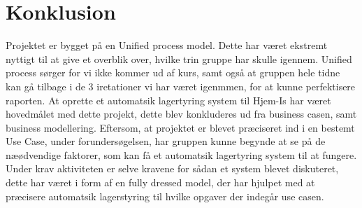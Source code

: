 \chapter{Konklusion}\label{ch:konklusion}

Projektet er bygget på en Unified process model. Dette har været ekstremt nyttigt til at give et overblik over, hvilke trin gruppe har skulle igennem. Unified process sørger for vi ikke kommer ud af kurs, samt også at gruppen hele tidne kan gå tilbage i de 3 iretationer vi har været igenmmen, for at kunne perfektisere raporten. 
At oprette et automatsik lagertyring system til Hjem-Is har været hovedmålet med dette projekt, dette blev konkluderes ud fra business casen, samt business modellering. Eftersom, at projektet er blevet præciseret ind i en bestemt Use Case, under forundersøgelsen, har gruppen kunne begynde at se på de næødvendige faktorer, som kan få et automatsik lagertyring system til at fungere. 
Under krav aktiviteten er selve kravene for sådan et system blevet diskuteret, dette har været i form af en fully dressed model, der har hjulpet med at præcisere automatsik lagerstyring til hvilke opgaver der indegår use casen. 